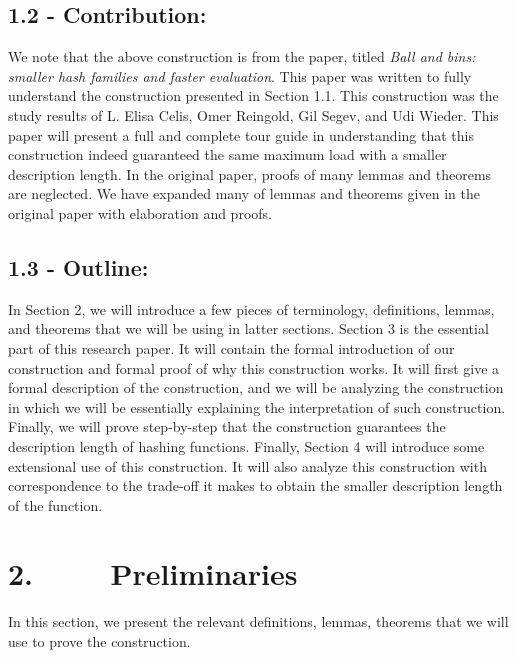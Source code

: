 \documentclass[a4paper, english]{paper}
\begin{document}
	\subsection{1.2 - Contribution:} 
	We note that the above construction is from the paper, titled \textit{Ball and bins: smaller hash families and faster evaluation}. This paper was written to fully understand the construction presented in Section 1.1. This construction was the study results of L. Elisa Celis, Omer Reingold, Gil Segev, and Udi Wieder. This paper will present a full and complete tour guide in understanding that this construction indeed guaranteed the same maximum load with a smaller description length. In the original paper, proofs of many lemmas and theorems are neglected. We have expanded many of lemmas and theorems given in the original paper with elaboration and proofs. \\
		
	\subsection{1.3 - Outline:} 
	In Section 2, we will introduce a few pieces of terminology, definitions, lemmas, and theorems that we will be using in latter sections. Section 3 is the essential part of this research paper. It will contain the formal introduction of our construction and formal proof of why this construction works. It will first give a formal description of the construction, and we will be analyzing the construction in which we will be essentially explaining the interpretation of such construction. Finally, we will prove step-by-step that the construction guarantees the description length of hashing functions. Finally, Section 4 will introduce some extensional use of this construction. It will also analyze this construction with correspondence to the trade-off it makes to obtain the smaller description length of the function. \\
	
	\section{2. $\qquad$ Preliminaries}
	In this section, we present the relevant definitions, lemmas, theorems that we will use to prove the construction.  \\
	
\end{document}
